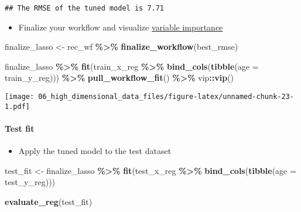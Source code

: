 \documentclass[
]{book}
\newenvironment{Shaded}{\begin{snugshade}}{\end{snugshade}}
\newcommand{\DataTypeTok}[1]{\textcolor[rgb]{0.13,0.29,0.53}{#1}}
\newcommand{\KeywordTok}[1]{\textcolor[rgb]{0.13,0.29,0.53}{\textbf{#1}}}
\newcommand{\NormalTok}[1]{#1}
\newcommand{\OperatorTok}[1]{\textcolor[rgb]{0.81,0.36,0.00}{\textbf{#1}}}
\newcommand{\StringTok}[1]{\textcolor[rgb]{0.31,0.60,0.02}{#1}}
\providecommand{\tightlist}{%
  \setlength{\itemsep}{0pt}\setlength{\parskip}{0pt}}
\begin{document}
\begin{verbatim}
## The RMSE of the tuned model is 7.71
\end{verbatim}

\begin{itemize}
\tightlist
\item
  Finalize your workflow and visualize \href{https://koalaverse.github.io/vip/articles/vip.html}{variable importance}
\end{itemize}

\begin{Shaded}
\begin{Highlighting}[]
\NormalTok{finalize\_lasso \textless{}{-}}\StringTok{ }\NormalTok{rec\_wf }\OperatorTok{\%\textgreater{}\%}
\StringTok{  }\KeywordTok{finalize\_workflow}\NormalTok{(best\_rmse)}

\NormalTok{finalize\_lasso }\OperatorTok{\%\textgreater{}\%}
\StringTok{  }\KeywordTok{fit}\NormalTok{(train\_x\_reg }\OperatorTok{\%\textgreater{}\%}\StringTok{ }\KeywordTok{bind\_cols}\NormalTok{(}\KeywordTok{tibble}\NormalTok{(}\DataTypeTok{age =}\NormalTok{ train\_y\_reg))) }\OperatorTok{\%\textgreater{}\%}
\StringTok{  }\KeywordTok{pull\_workflow\_fit}\NormalTok{() }\OperatorTok{\%\textgreater{}\%}
\StringTok{  }\NormalTok{vip}\OperatorTok{::}\KeywordTok{vip}\NormalTok{()}
\end{Highlighting}
\end{Shaded}

\texttt{[image: 06\_high\_dimensional\_data\_files/figure-latex/unnamed-chunk-23-1.pdf]}

\hypertarget{test-fit}{%
\paragraph{Test fit}\label{test-fit}}

\begin{itemize}
\tightlist
\item
  Apply the tuned model to the test dataset
\end{itemize}

\begin{Shaded}
\begin{Highlighting}[]
\NormalTok{test\_fit \textless{}{-}}\StringTok{ }\NormalTok{finalize\_lasso }\OperatorTok{\%\textgreater{}\%}\StringTok{ }
\StringTok{  }\KeywordTok{fit}\NormalTok{(test\_x\_reg }\OperatorTok{\%\textgreater{}\%}\StringTok{ }\KeywordTok{bind\_cols}\NormalTok{(}\KeywordTok{tibble}\NormalTok{(}\DataTypeTok{age =}\NormalTok{ test\_y\_reg)))}

\KeywordTok{evaluate\_reg}\NormalTok{(test\_fit)}
\end{Highlighting}
\end{Shaded}
\end{document}
